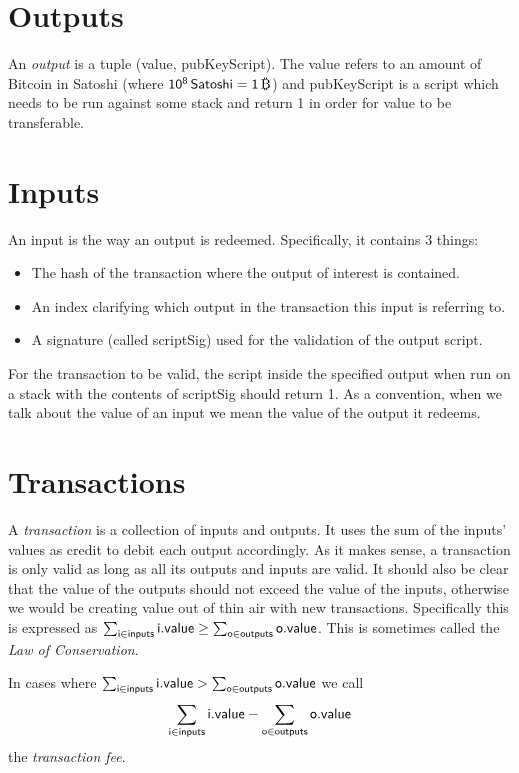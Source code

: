 \section{\label{sec:outputs}Outputs}
An \emph{output} is a tuple ({\sf value, pubKeyScript}). The \textsf{value} refers to an amount of Bitcoin in Satoshi (where $\sf 10^8 \, Satoshi = 1 \, \bitcoin$) and \textsf{pubKeyScript} is a script which needs to be run against some stack and return 1 in order for \textsf{value} to be transferable.

\section{\label{sec:inputs}Inputs}
An input is the way an output is redeemed. Specifically, it contains 3 things:
\begin{itemize}
  \item The hash of the transaction where the output of interest is contained.
  \item An index clarifying which output in the transaction this input is referring to.
  \item A signature (called \textsf{scriptSig}) used for the validation of the output script.
\end{itemize}

For the transaction to be valid, the script inside the specified output when run on a stack with the contents of \textsf{scriptSig} should return 1. As a convention, when we talk about the value of an input we mean the value of the output it redeems.
%

\section{\label{sec:transactions}Transactions}
A \emph{transaction} is a collection of inputs and outputs. It uses the sum of the inputs' values as credit to debit each output accordingly. As it makes sense, a transaction is only valid as long as all its outputs and inputs are valid. It should also be clear that the value of the outputs should not exceed the value of the inputs, otherwise we would be creating value out of thin air with new transactions. Specifically this is expressed as $\sum_{\sf i \in inputs} {\sf i.value} \ge \sum_{\sf o \in outputs} {\sf o.value}$. This is sometimes called the \emph{Law of Conservation}.

In cases where $\sum_{\sf i \in inputs} {\sf i.value} > \sum_{\sf o \in outputs} {\sf o.value}$ we call
\begin{equation}
  \sum_{\sf i \in inputs} {\sf i.value} - \sum_{\sf o \in outputs} {\sf o.value}
\end{equation}
the \emph{transaction fee}.

